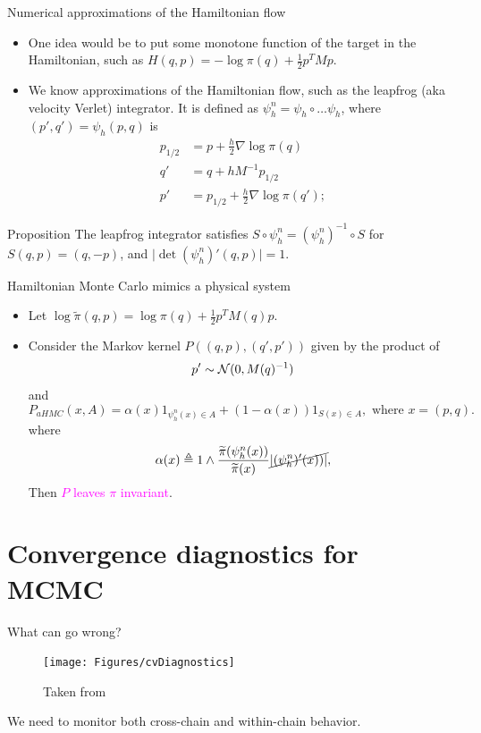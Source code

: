 \documentclass[10pt]{beamer}
\let\oldcitep=\citep
\renewcommand\citep[1]{\hyperlink{#1}{\textcolor{vert}{\oldcitep{#1}}}}
\def\tpi{\widetilde{\pi}}
\renewcommand\un[1]{\textcolor{magenta}{#1}}
\def\blank{\vspace{.5\textheight}}
\begin{document}
\begin{frame}{Numerical approximations of the Hamiltonian flow}
\begin{itemize}
  \item One idea would be to put some monotone function of the target in the Hamiltonian, such as $ H(q,p) = -\log \pi(q) + \frac12 p^T M p $.
  \item We know approximations of the Hamiltonian flow, such as the leapfrog (aka velocity Verlet) integrator. It is defined as $\psi_h^n = \psi_h \circ \dots \psi_h$, where $(p',q') = \psi_h(p,q)$ is 
\begin{align*}
    p_{1/2} &= p + \frac{h}{2}\nabla \log \pi(q)\\
    q' &= q+hM^{-1}p_{1/2}\\
    p' &= p_{1/2} + \frac{h}{2} \nabla \log\pi (q');
\end{align*}
\end{itemize}
\begin{block}{Proposition}
  The leapfrog integrator satisfies $S\circ \psi_h^n = (\psi_h^n)^{-1}\circ S$ for $S(q,p) = (q,-p)$, and $\vert \det (\psi_h^n)'(q,p)\vert = 1$. 
\end{block}
\end{frame}

\begin{frame}{Hamiltonian Monte Carlo mimics a physical system}
  \begin{itemize}
    \item Let $\log \tpi(q, p) =  \log \pi(q) + \frac12 p^T M(q) p$.
    \item Consider the Markov kernel $P((q,p), (q',p'))$ given by the product of
    $$ p'\sim \mathcal{N}(0,M(q)^{-1})$$
    and
    $$
    P_{aHMC}(x,A) = \alpha(x) 1_{\psi_h^n(x)\in A} + (1-\alpha(x))1_{S(x)\in A}, \text{ where } x=(p,q).
    $$
    where 
    \begin{equation}
      \alpha(x) \triangleq 1\wedge \frac{\tpi(\psi_h^n(x))}{\tpi(x)} \cancel{\vert (\psi_h^n)'(x))\vert},
    \end{equation}
    Then \un{$P$ leaves $\pi$ invariant}.
\end{itemize}
\blank
\end{frame}



\section{Convergence diagnostics for MCMC}
\begin{frame}{What can go wrong?}
\begin{figure}
\texttt{[image: Figures/cvDiagnostics]}
\caption{Taken from \citep{GCSDVR13}}
\end{figure}
We need to monitor both cross-chain and within-chain behavior.
\end{frame}
\end{document}

